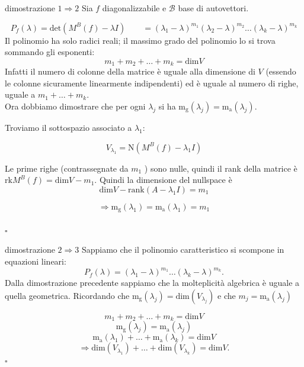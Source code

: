 \documentclass[x11names]{article}
\newcommand*{\QEDB}{\null\nobreak\hfill\ensuremath{\square}}%
\begin{document}
\begin{es}{dimostrazione $1 \Rightarrow 2$}
Sia  $f$ diagonalizzabile e  $\mathscr{B}$ base di autovettori.
\begin{center}

\end{center}

\[
P_{f}\left(\lambda\right) = \text{det}\left(M^{B}\left(f\right)-\lambda I\right) \qquad = \left(\lambda_1 - \lambda\right)^{m_1}\left(\lambda_2 - \lambda\right)^{m_2} \dots \left(\lambda_{k} - \lambda\right)^{m_{k}}
\] 
Il polinomio ha solo radici reali; il massimo grado del polinomio lo si trova sommando gli esponenti:
\[
m_1 + m_2 + \dots + m_{k} = \text{dim}V
\]
Infatti il numero di colonne della matrice è uguale alla dimensione di $V$ (essendo le colonne sicuramente linearmente indipendenti) ed è uguale al numero di righe, uguale a $m_1 + \dots + m_{k}$. \\ 

Ora dobbiamo dimostrare che per ogni $\lambda_{j}$ si ha $\text{m}_{\text{g}}\left(\lambda_{j}\right) = \text{m}_{\text{a}}\left(\lambda_{j}\right)$.

Troviamo il sottospazio associato a $\lambda_1$:

\[
V_{\lambda_{1}} = \text{N}\left(M^B\left(f\right) - \lambda_1 I\right)
\] 

\begin{center}

\end{center}

Le prime righe (contrassegnate da $m_1$ ) sono nulle, quindi il rank della matrice è $\text{rk}M^B\left(f\right) = \text{dim}V - m_1$.  Quindi la dimensione del nullspace è
\[
\text{dim}V - \text{rank}\left(A-\lambda_1 I\right) = m_1
\] 

\[
\Longrightarrow \text{m}_{\text{g}}\left(\lambda_{1}\right) = \text{m}_{\text{a}}\left(\lambda_{1}\right) = m_1
\] 
\\
\QEDB
\end{es}

\begin{es}{dimostrazione $2 \Rightarrow 3$}
Sappiamo che il polinomio caratteristico si scompone in equazioni lineari:
\[
P_{f}\left(\lambda\right) = \left(\lambda_1 - \lambda\right)^{m_1}\dots\left(\lambda_{k} - \lambda\right)^{m_{k}}
.\] 
Dalla dimostrazione precedente sappiamo che la molteplicità algebrica è uguale a quella geometrica. Ricordando che $\text{m}_{\text{g}}\left(\lambda_{j}\right)=\text{dim}\left(V_{\lambda_{j}}\right)$ e che $m_j = \text{m}_{\text{a}}\left(\lambda_{j}\right)$

\[
m_1 + m_2 + \dots + m_{k} = \text{dim}V
\] 
\[
\text{m}_{\text{g}}\left(\lambda_{j}\right) = \text{m}_{\text{a}}\left(\lambda_{j}\right)
\] 
\[
 \text{m}_{\text{a}}\left(\lambda_{1}\right) + \dots +  \text{m}_{\text{a}}\left(\lambda_{k}\right) = \text{dim}V
\]
\[
\Longrightarrow \text{dim}\left(V_{\lambda_{1}}\right) + \dots + \text{dim}\left(V_{\lambda_{k}}\right) = \text{dim}V
.\]  \QEDB
\end{es}
\end{document}
